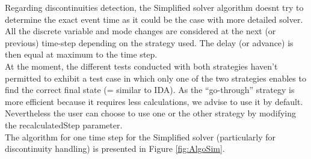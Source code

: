 \documentclass[a4paper, 12pt]{report}
\begin{document}
Regarding discontinuities detection, the Simplified solver algorithm doesn\textquotesingle t try to determine the exact event time as it could be the case with more detailed solver. All the discrete variable and mode changes are considered at the next (or previous) time-step depending on the strategy used. The delay (or advance) is then equal at maximum to the time step. \\

At the moment, the different tests conducted with both strategies haven't permitted to exhibit a test case in which only one of the two strategies enables to find the correct final state (= similar to IDA). As the ``go-through'' strategy is more efficient because it requires less calculations, we advise to use it by default. Nevertheless the user can choose to use one or the other strategy by modifying the recalculatedStep parameter. \\

The algorithm for one time step for the Simplified solver (particularly for discontinuity handling) is presented in Figure \ref{fig:AlgoSim}.
\end{document}
